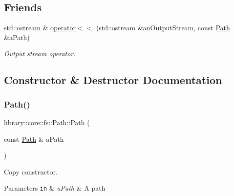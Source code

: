 \subsection*{Friends}
\begin{DoxyCompactItemize}
\item 
std\+::ostream \& \hyperlink{classlibrary_1_1core_1_1fs_1_1_path_a87813ac3ede0b43b50ae6b9fdf0a2815}{operator$<$$<$} (std\+::ostream \&an\+Output\+Stream, const \hyperlink{classlibrary_1_1core_1_1fs_1_1_path}{Path} \&a\+Path)
\begin{DoxyCompactList}\small\item\em Output stream operator. \end{DoxyCompactList}\end{DoxyCompactItemize}


\subsection{Constructor \& Destructor Documentation}
\mbox{\label{classlibrary_1_1core_1_1fs_1_1_path_aabc4240fc08479d1bff6b9753f2b5cc2}} 
\subsubsection{\texorpdfstring{Path()}{Path()}}
{\footnotesize\ttfamily library\+::core\+::fs\+::\+Path\+::\+Path (\begin{DoxyParamCaption}\item[{const \hyperlink{classlibrary_1_1core_1_1fs_1_1_path}{Path} \&}]{a\+Path }\end{DoxyParamCaption})}



Copy constructor. 


\begin{DoxyParams}[1]{Parameters}
\mbox{\tt in}  & {\em a\+Path} & A path \\
\hline
\end{DoxyParams}
\mbox{\label{classlibrary_1_1core_1_1fs_1_1_path_aa120129d701f0b2366d805f73000cbc6}} 
